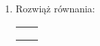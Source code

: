 \documentclass[12pt,a4paper]{article}
\begin{document}
	\begin{enumerate}[1.]
		
	\item Rozwiąż równania: 
	
	\begin{enumerate}[a)] \begin{tabular}{p{7cm} p{7cm}} 
			\item $||x+3|-4|=5$ & \vspace{0.4cm} 	\item$||x-1|-1|=|x-2|$ \\
			\item $ $ & \item $ $ \\
			\item $ $ & \item $ $ \\
	\end{tabular} \end{enumerate}
		
	\end{enumerate}
	
	
	
\end{document}
